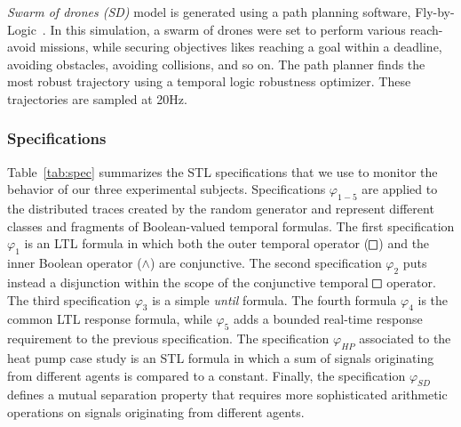 \noindent \emph{Swarm of drones (SD)} model is generated using a path planning software, Fly-by-Logic~\cite{PantAM17CCTA}. In this simulation, a swarm of drones were set to perform various reach-avoid missions, while securing objectives likes reaching a goal within a deadline, avoiding obstacles, avoiding collisions, and so on. The path planner finds the most robust trajectory using a temporal logic robustness optimizer. These trajectories are sampled at 20Hz.

\subsubsection{Specifications}

Table~\ref{tab:spec} summarizes the STL specifications that we use to monitor the behavior of our three experimental subjects. Specifications $\varphi_{1-5}$ are applied to the distributed traces created by the random generator and represent different classes and fragments of Boolean-valued temporal formulas. The first specification $\varphi_1$ is an LTL formula in which both the outer temporal operator ($\LTLg$) and the inner Boolean operator ($\wedge$) are conjunctive. The second specification $\varphi_2$ puts instead a disjunction within the scope of the conjunctive temporal $\LTLg$ operator. The third specification $\varphi_3$ is a simple \emph{until} formula. The fourth formula $\varphi_4$ is the common LTL response formula, while $\varphi_5$ adds a bounded real-time response requirement to the previous specification. The specification $\varphi_{HP}$ associated to the heat pump case study is an STL formula in which a sum of signals originating from different agents is compared to a constant. Finally, the specification $\varphi_{SD}$ defines a mutual separation property that requires more sophisticated arithmetic operations on signals originating from different agents.  

